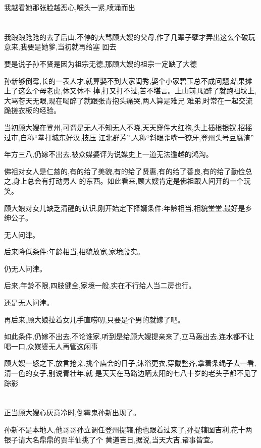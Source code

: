 ﻿\documentclass[12pt]{article}
\begin{document}
我越看她那张脸越恶心,喉头一紧,喷涌而出\dldots

\section{}

我踉踉跄跄的去了后山,不停的大骂顾大嫂的父母,作了几辈子孽才弄出这么个破玩意来,我要是她爹,当初就再给塞
回去

要是说子孙不贤是因为祖宗无德,那顾大嫂的祖宗一定缺了大德

孙新够倒霉,长的一表人才,就算娶不到大家闺秀,娶个小家碧玉总不成问题,结果摊上了这么个母老虎,休又休不
掉,打又打不过,苦不堪言。上山前,喝醉了就跑祖坟上,大骂苍天无眼,现在喝醉了就跟张青抱头痛哭,两人算是难兄
难弟,时常在一起交流跪搓衣板的经验。

当初顾大嫂在登州,可谓是无人不知无人不晓,天天穿件大红袍,头上插根银钗,招摇过市,自称``拳打城东好汉,技压
江北群芳'',人称``斜眼歪嘴一獠牙,登州头号豆腐渣''

年方三八,仍嫁不出去,被众媒婆评为说媒史上一道无法逾越的鸿沟。

佛祖对女人是仁慈的,有的给了美貌,有的给了贤惠,有的给了善良,有的给了勤俭\dldots 总之,身上总会有打动男人
的东西。如此看来,顾大嫂肯定是佛祖跟人间开的一个玩笑。

顾大娘对女儿缺乏清醒的认识,刚开始定下择婿条件:年龄相当,相貌堂堂,最好是乡绅公子。

无人问津。

后来降低条件:年龄相当,相貌放宽,家境殷实。

仍无人问津。

后来,年龄不限,四肢健全,家境一般,实在不行给人当二房也行。

还是无人问津。

再后来,顾大娘拉着女儿手直唠叨,只要是个男的就嫁了吧。

如此条件,仍嫁不出去,不论谁家,听到是给顾大嫂提亲来了,立马轰出去,连水都不让喝一口,众媒婆无人再管这闲事

顾大嫂一怒之下,放言抢亲,挑个庙会的日子,沐浴更衣,穿戴整齐,拿着条绳子去一看,清一色的女子,别说青壮年,就
是天天在马路边晒太阳的七八十岁的老头子都不见了踪影
\section{}

正当顾大嫂心灰意冷时,倒霉鬼孙新出现了。

孙新不是本地人,他哥哥孙立调任登州提辖,他也跟着过来了,孙提辖图吉利,花十两银子请大名鼎鼎的贾半仙挑了个
黄道吉日,据说,当天大吉,诸事皆宜。
\end{document}
